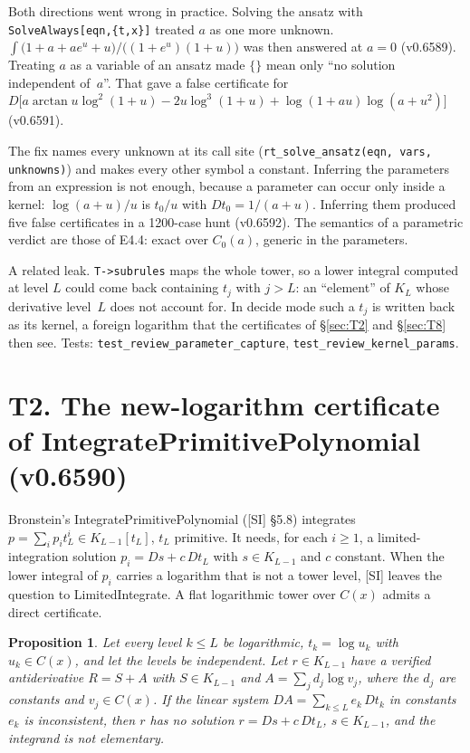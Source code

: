 \documentclass[11pt]{article}
\newtheorem{proposition}[theorem]{Proposition}
\theoremstyle{definition}
\theoremstyle{remark}
\newcommand{\code}[1]{\texttt{#1}}
\begin{document}
Both directions went wrong in practice. Solving the ansatz with \code{SolveAlways[eqn,\{t,x\}]}
treated $a$ as one more unknown. $\int\bigl(1+a+ae^u+u\bigr)/\bigl((1+e^u)(1+u)\bigr)$
was then answered at $a=0$ (v0.6589). Treating $a$ as a variable of an ansatz made
$\{\}$ mean only ``no solution independent of~$a$''. That gave a false certificate
for $D\bigl[a\arctan u\log^2(1+u)-2u\log^3(1+u)+\log(1+au)\log(a+u^2)\bigr]$ (v0.6591).

The fix names every unknown at its call site (\code{rt\_solve\_ansatz(eqn, vars, unknowns)})
and makes every other symbol a constant. Inferring the parameters from an expression is
not enough, because a parameter can occur only inside a kernel: $\log(a+u)/u$ is
$t_0/u$ with $Dt_0=1/(a+u)$. Inferring them produced five false certificates in a
1200-case hunt (v0.6592). The semantics of a parametric verdict are those of E4.4:
exact over $C_0(a)$, generic in the parameters.

A related leak. \code{T->subrules} maps the whole tower, so a lower integral computed at
level $L$ could come back containing $t_j$ with $j>L$: an ``element'' of $K_L$ whose
derivative level~$L$ does not account for. In decide mode such a $t_j$ is written back
as its kernel, a foreign logarithm that the certificates of \S\ref{sec:T2} and
\S\ref{sec:T8} then see. Tests: \code{test\_review\_parameter\_capture},
\code{test\_review\_kernel\_params}.

\section*{T2. The new-logarithm certificate of IntegratePrimitivePolynomial (v0.6590)}
\label{sec:T2}

Bronstein's IntegratePrimitivePolynomial ([SI] \S5.8) integrates
$p=\sum_i p_i t_L^i\in K_{L-1}[t_L]$, $t_L$ primitive. It needs, for each $i\ge1$, a
limited-integration solution $p_i=Ds+c\,Dt_L$ with $s\in K_{L-1}$ and $c$ constant.
When the lower integral of $p_i$ carries a logarithm that is not a tower level, [SI]
leaves the question to LimitedIntegrate. A flat logarithmic tower over $C(x)$ admits a
direct certificate.

\begin{proposition}\label{prop:T2}
Let every level $k\le L$ be logarithmic, $t_k=\log u_k$ with $u_k\in C(x)$, and let the
levels be independent. Let $r\in K_{L-1}$ have a verified antiderivative $R=S+A$ with
$S\in K_{L-1}$ and $A=\sum_jd_j\log v_j$, where the $d_j$ are constants and $v_j\in C(x)$.
If the linear system $DA=\sum_{k\le L}e_k\,Dt_k$ in constants $e_k$ is inconsistent,
then $r$ has no solution $r=Ds+c\,Dt_L$, $s\in K_{L-1}$, and the integrand is not
elementary.
\end{proposition}
\end{document}
